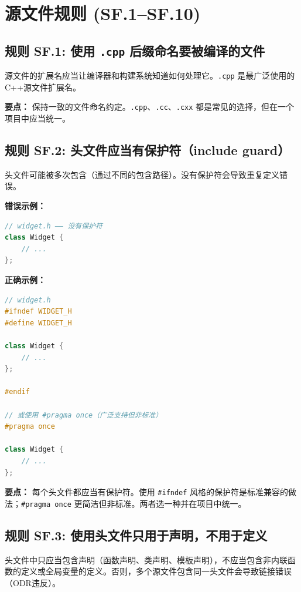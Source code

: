 \section{源文件规则 (SF.1--SF.10)}

\subsection*{\textbf{规则 SF.1:} 使用 \texttt{.cpp} 后缀命名要被编译的文件}

源文件的扩展名应当让编译器和构建系统知道如何处理它。\texttt{.cpp} 是最广泛使用的C++源文件扩展名。

\textbf{要点：} 保持一致的文件命名约定。\texttt{.cpp}、\texttt{.cc}、\texttt{.cxx} 都是常见的选择，但在一个项目中应当统一。

\subsection*{\textbf{规则 SF.2:} 头文件应当有保护符（include guard）}

头文件可能被多次包含（通过不同的包含路径）。没有保护符会导致重复定义错误。

\textbf{错误示例：}

\begin{lstlisting}[language=C++]
// widget.h —— 没有保护符
class Widget {
    // ...
};
\end{lstlisting}

\textbf{正确示例：}

\begin{lstlisting}[language=C++]
// widget.h
#ifndef WIDGET_H
#define WIDGET_H

class Widget {
    // ...
};

#endif

// 或使用 #pragma once（广泛支持但非标准）
#pragma once

class Widget {
    // ...
};
\end{lstlisting}

\textbf{要点：} 每个头文件都应当有保护符。使用 \texttt{\#ifndef} 风格的保护符是标准兼容的做法；\texttt{\#pragma once} 更简洁但非标准。两者选一种并在项目中统一。

\subsection*{\textbf{规则 SF.3:} 使用头文件只用于声明，不用于定义}

头文件中只应当包含声明（函数声明、类声明、模板声明），不应当包含非内联函数的定义或全局变量的定义。否则，多个源文件包含同一头文件会导致链接错误（ODR违反）。

